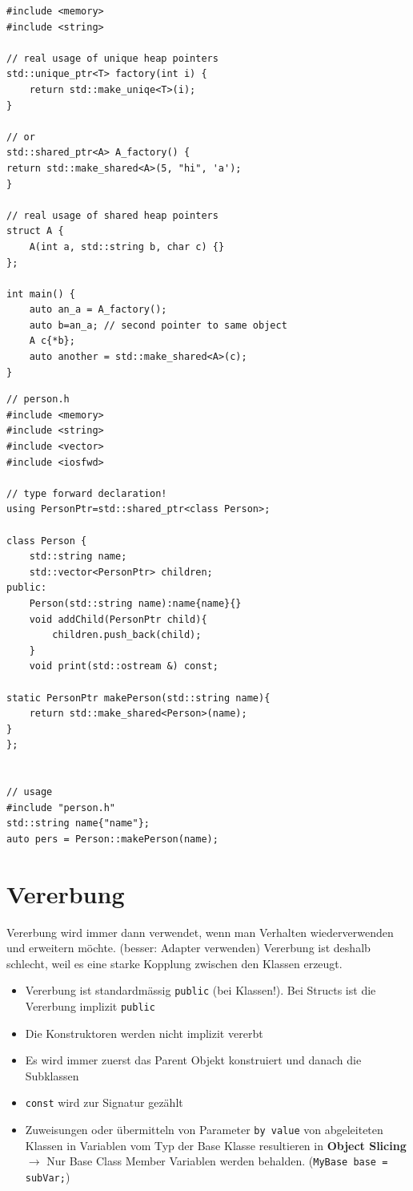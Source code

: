 \begin{lstlisting}
#include <memory>
#include <string>

// real usage of unique heap pointers
std::unique_ptr<T> factory(int i) {
	return std::make_uniqe<T>(i);
}

// or
std::shared_ptr<A> A_factory() {
return std::make_shared<A>(5, "hi", 'a');
}

// real usage of shared heap pointers
struct A {
	A(int a, std::string b, char c) {}
};

int main() {
	auto an_a = A_factory();
	auto b=an_a; // second pointer to same object
	A c{*b};
	auto another = std::make_shared<A>(c);
}
\end{lstlisting}

\clearpage

\begin{lstlisting}
// person.h
#include <memory>
#include <string>
#include <vector>
#include <iosfwd>

// type forward declaration!
using PersonPtr=std::shared_ptr<class Person>;

class Person {
	std::string name;
	std::vector<PersonPtr> children;
public:
	Person(std::string name):name{name}{}
	void addChild(PersonPtr child){
		children.push_back(child);
	}
	void print(std::ostream &) const;

static PersonPtr makePerson(std::string name){
	return std::make_shared<Person>(name);
}
};


// usage
#include "person.h"
std::string name{"name"};
auto pers = Person::makePerson(name);
\end{lstlisting}

\section{Vererbung}
Vererbung wird immer dann verwendet, wenn man Verhalten wiederverwenden und erweitern möchte. (besser: Adapter verwenden) Vererbung ist deshalb schlecht, weil es eine starke Kopplung zwischen den Klassen erzeugt. 
\begin{itemize}
	\item Vererbung ist standardmässig \lstinline|public| (bei Klassen!). Bei Structs ist die Vererbung implizit \lstinline|public|
	\item Die Konstruktoren werden nicht implizit vererbt
	\item Es wird immer zuerst das Parent Objekt konstruiert und danach die Subklassen
	\item \lstinline|const| wird zur Signatur gezählt
	\item Zuweisungen oder übermitteln von Parameter \lstinline|by value| von abgeleiteten Klassen in Variablen vom Typ der Base Klasse resultieren in \textbf{Object Slicing} \\ $\rightarrow$ Nur Base Class Member Variablen werden behalden. (\lstinline|MyBase base = subVar;|)
\end{itemize}

